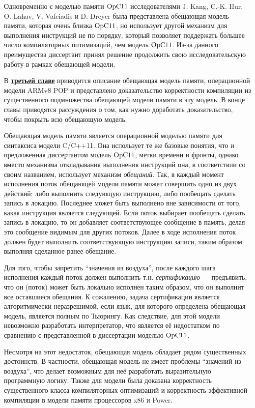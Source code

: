 Одновременно с моделью памяти $\mathrm{OpC11}$ исследователями J. Kang, C.-K. Hur, O. Lahav, V. Vafeiadis и D. Dreyer была представлена обещающая модель
памяти, которая очень близка $\mathrm{OpC11}$, но использует другой механизм для выполнения инструкций не по порядку, который позволяет
поддержать большее число компиляторных оптимизаций, чем модель $\mathrm{OpC11}$.
Из-за данного преимущества диссертант принял решение продолжить свою исследовательскую работу в рамках обещающей модели.

В \underline{\textbf{третьей главе}} приводится описание обещающая модель памяти, операционной модели ARMv8 POP и представлено доказательство
корректности компиляции из существенного подмножества обещающей модели памяти в эту модель.
В конце главы приводятся рассуждения о том, как нужно доработать доказательство, чтобы покрыть всю обещающую модель.

Обещающая модель памяти является операционной моделью памяти для синтаксиса модели C/C++11.
Она использует те же базовые понятия, что и предложенная диссертантом модель $\mathrm{OpC11}$,
метки времени и фронты, однако вместо механизма откладывания выполнения инструкций она,
в соответствии со своим названием, использует механизм \emph{обещаний}. Так, в каждый момент исполнения поток
обещающей модели памяти может совершить одно из двух действий: либо выполнить следующую инструкцию,
либо пообещать сделать запись в локацию. Последнее может быть выполнено вне зависимости от того, какая
инструкция является следующей.
Если поток выбирает пообещать сделать запись в локацию, то он добавляет соответствующее сообщение в память,
делая это сообщение видимым для других потоков. Далее в ходе исполнения поток должен будет выполнить соответствующую инструкцию записи, таким образом выполняя сделанное ранее обещание.

Для того, чтобы запретить ``значения из воздуха'', после каждого шага исполнения каждый поток должен выполнить
т.н. \emph{сертификацию} --- предъявить, что он (поток) может быть локально исполнен таким образом, что
он выполнит все оставшиеся обещания. К сожалению, задача сертификации является алгоритмически неразрешимой, если
язык, для которого определена обещающая модель, является полным по Тьюрингу. Как следствие, для
этой модели невозможно разработать интерпретатор, что является её недостатком по сравнению с представленной в
диссертации моделью $\mathrm{OpC11}$.

Несмотря на этот недостаток, обещающая модель обладает рядом существенных достоинств.
В частности, обещающая модель не имеет проблемы ``значений из воздуха'', что делает возможным для неё разработать
выразительную программную логику. Также для модели была доказана корректность существенного класса компиляторных
оптимизаций и корректность эффективной компиляции в модели памяти процессоров x86 и Power.


